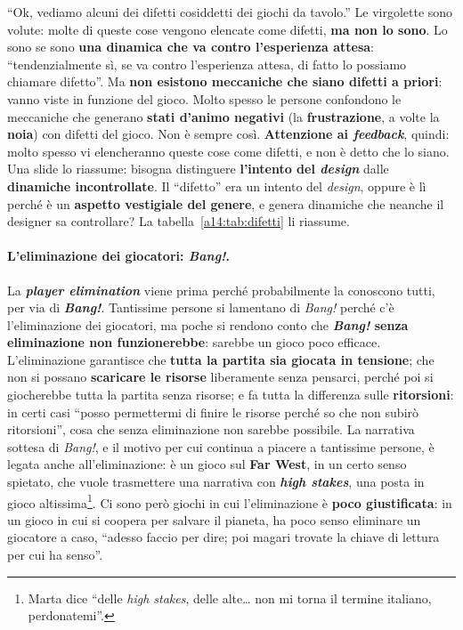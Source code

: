 ``Ok, vediamo alcuni dei difetti cosiddetti dei giochi da tavolo.'' Le virgolette sono volute:
molte di queste cose vengono elencate come difetti, \textbf{ma non lo sono}. Lo sono se sono
\textbf{una dinamica che va contro l'esperienza attesa}: ``tendenzialmente sì, se va contro
l'esperienza attesa, di fatto lo possiamo chiamare difetto''. Ma \textbf{non esistono meccaniche
che siano difetti a priori}: vanno viste in funzione del gioco. Molto spesso le persone
confondono le meccaniche che generano \textbf{stati d'animo negativi} (la
\textbf{frustrazione}, a volte la \textbf{noia}) con difetti del gioco. Non è sempre così.
\textbf{Attenzione ai \emph{feedback}}, quindi: molto spesso vi elencheranno queste cose come
difetti, e non è detto che lo siano. Una slide lo riassume: bisogna distinguere
\textbf{l'intento del \emph{design}} dalle \textbf{dinamiche incontrollate}. Il ``difetto'' era
un intento del \emph{design}, oppure è lì perché è un \textbf{aspetto vestigiale del genere}, e
genera dinamiche che neanche il designer sa controllare? La tabella~\ref{a14:tab:difetti} li
riassume.

\paragraph{L'eliminazione dei giocatori: \emph{Bang!}.} La \textbf{\emph{player elimination}}
viene prima perché probabilmente la conoscono tutti, per via di \textbf{\emph{Bang!}}. Tantissime
persone si lamentano di \emph{Bang!} perché c'è l'eliminazione dei giocatori, ma poche si
rendono conto che \textbf{\emph{Bang!} senza eliminazione non funzionerebbe}: sarebbe un gioco
poco efficace. L'eliminazione garantisce che \textbf{tutta la partita sia giocata in tensione};
che non si possano \textbf{scaricare le risorse} liberamente senza pensarci, perché poi si
giocherebbe tutta la partita senza risorse; e fa tutta la differenza sulle
\textbf{ritorsioni}: in certi casi ``posso permettermi di finire le risorse perché so che non
subirò ritorsioni'', cosa che senza eliminazione non sarebbe possibile. La narrativa sottesa di
\emph{Bang!}, e il motivo per cui continua a piacere a tantissime persone, è legata anche
all'eliminazione: è un gioco sul \textbf{Far West}, in un certo senso spietato, che vuole
trasmettere una narrativa con \textbf{\emph{high stakes}}, una posta in gioco
altissima\footnote{Marta dice ``delle \emph{high stakes}, delle alte\ldots{} non mi torna il
termine italiano, perdonatemi''.}. Ci sono però giochi in cui l'eliminazione è \textbf{poco
giustificata}: in un gioco in cui si coopera per salvare il pianeta, ha poco senso eliminare
un giocatore a caso, ``adesso faccio per dire; poi magari trovate la chiave di lettura per cui
ha senso''.

